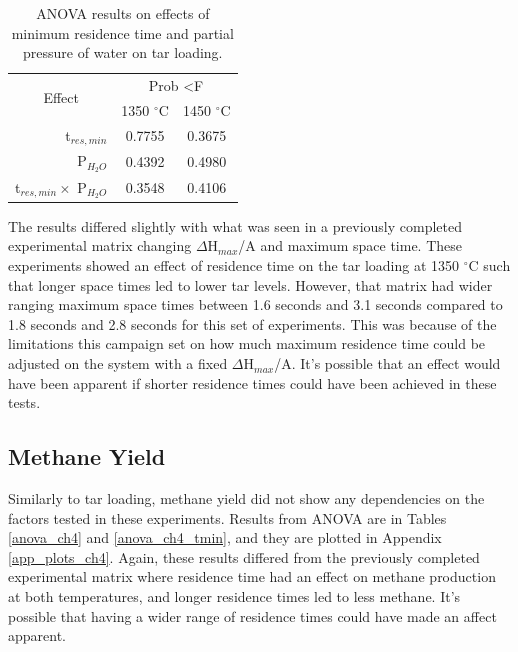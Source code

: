 \documentclass[11pt,twocolumn]{article}
\begin{document}
\begin{table}
	\centering
	\caption{ANOVA results on effects of minimum residence time and partial pressure of water on tar loading.}
	\begin{tabular}{r c c}
		\toprule
		\multicolumn{1}{c}{\multirow{2}{*}{Effect}}		& 	\multicolumn{2}{c}{Prob \textless F	}	\\
		{}								&	1350 $^\circ$C					&	1450 $^\circ$C			\\
		\midrule
		t$_{res,min}$						&	0.7755					&	0.3675			\\
		P$_{H_2O}$						&	0.4392					&	0.4980			\\
		t$_{res,min}\times$ P$_{H_2O}$		&	0.3548					&	0.4106			\\
		\bottomrule
	\end{tabular}
	\label{anova_tar_tmin}
\end{table}

The results differed slightly with what was seen in a previously completed experimental matrix changing $\Delta$H$_{max}$/A and maximum space time.  These experiments showed an effect of residence time on the tar loading at 1350 $^\circ$C such that longer space times led to lower tar levels.  However, that matrix had wider ranging maximum space times between 1.6 seconds and 3.1 seconds compared to 1.8 seconds and 2.8 seconds for this set of experiments.  This was because of the limitations this campaign set on how much maximum residence time could be adjusted on the system with a fixed $\Delta$H$_{max}$/A.  It's possible that an effect would have been apparent if shorter residence times could have been achieved in these tests. 

\subsection*{Methane Yield}

Similarly to tar loading, methane yield did not show any dependencies on the factors tested in these experiments.  Results from ANOVA are in Tables \ref{anova_ch4} and \ref{anova_ch4_tmin}, and they are plotted in Appendix \ref{app_plots_ch4}.  Again, these results differed from the previously completed experimental matrix where residence time had an effect on methane production at both temperatures, and longer residence times led to less methane.  It's possible that having a wider range of residence times could have made an affect apparent.
\end{document}
